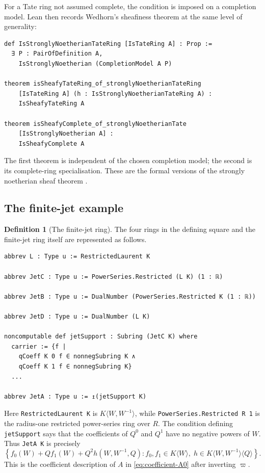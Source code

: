 \documentclass[11pt,reqno]{amsart}
\theoremstyle{definition}
\newtheorem{definition}[definition]{Definition}
\begin{document}
For a Tate ring not assumed complete, the condition is imposed on a completion
model.  Lean then records Wedhorn's sheafiness theorem at the same level of
generality:

\begin{lstlisting}
def IsStronglyNoetherianTateRing [IsTateRing A] : Prop :=
  ∃ P : PairOfDefinition A,
    IsStronglyNoetherian (CompletionModel A P)

theorem isSheafyTateRing_of_stronglyNoetherianTateRing
    [IsTateRing A] (h : IsStronglyNoetherianTateRing A) :
    IsSheafyTateRing A

theorem isSheafyComplete_of_stronglyNoetherianTate
    [IsStronglyNoetherian A] :
    IsSheafyComplete A
\end{lstlisting}

The first theorem is independent of the chosen completion model; the second is
its complete-ring specialisation.  These are the formal versions of the
strongly noetherian sheaf theorem \cite[Theorem~8.28(b)]{Wedhorn}.

\subsection{The finite-jet example}

\begin{definition}[The finite-jet ring]
\label{def:lean-finite-jet-ring}
The four rings in the defining square and the finite-jet ring itself are
represented as follows.

\begin{lstlisting}
abbrev L : Type u := RestrictedLaurent K

abbrev JetC : Type u := PowerSeries.Restricted (L K) (1 : ℝ)

abbrev JetB : Type u := DualNumber (PowerSeries.Restricted K (1 : ℝ))

abbrev JetD : Type u := DualNumber (L K)

noncomputable def jetSupport : Subring (JetC K) where
  carrier := {f |
    qCoeff K 0 f ∈ nonnegSubring K ∧
    qCoeff K 1 f ∈ nonnegSubring K}
  ...

abbrev JetA : Type u := ↥(jetSupport K)
\end{lstlisting}

Here \texttt{RestrictedLaurent K} is
\(K\langle W,W^{-1}\rangle\), while
\texttt{PowerSeries.Restricted R 1} is the radius-one restricted power-series
ring over \(R\).  The condition defining \texttt{jetSupport} says that the
coefficients of \(Q^0\) and \(Q^1\) have no negative powers of \(W\).  Thus
\texttt{JetA K} is precisely
\[
  \left\{
    f_0(W)+Qf_1(W)+Q^2h(W,W^{-1},Q):
    f_0,f_1\in K\langle W\rangle,\;
    h\in K\langle W,W^{-1}\rangle\langle Q\rangle
  \right\}.
\]
This is the coefficient description of \(A\) in
\eqref{eq:coefficient-A0} after inverting \(\varpi\).
\end{definition}
\end{document}
